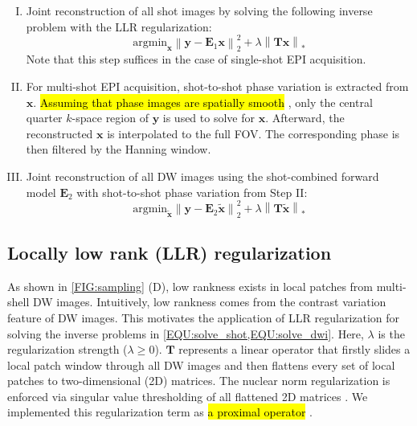 \documentclass[preprint,12pt,authoryear,review]{elsarticle}
\begin{document}
    \begin{enumerate}[I.]
        \item Joint reconstruction of all shot images
        by solving the following inverse problem with
        the LLR regularization:
        \begin{equation}
            \mathrm{argmin}_\mathbf{x} \left\| \mathbf{y} - \mathbf{E}_1 \mathbf{x} \right\|_2^2
            + \lambda \left\| \mathbf{T} \mathbf{x} \right\|_*
            \label{EQU:solve_shot}
        \end{equation}
            Note that this step suffices in the case of single-shot EPI acquisition.

        \item For multi-shot EPI acquisition,
        shot-to-shot phase variation is extracted from $\mathbf{x}$.
        \hl{Assuming that phase images are spatially smooth}
        \citep{chen_2013_muse,dai_2023_julep},
        only the central quarter $k$-space region of $\mathbf{y}$
        is used to solve for $\mathbf{x}$.
        Afterward, the reconstructed $\mathbf{x}$ is interpolated to the full FOV.
        The corresponding phase is then filtered by the Hanning window.

        \item Joint reconstruction of all DW images using
        the shot-combined forward model $\mathbf{E}_2$
        with shot-to-shot phase variation from Step II:
        \begin{equation}
            \mathrm{argmin}_\mathbf{\tilde{x}} \left\| \mathbf{y} - \mathbf{E}_2 \mathbf{\tilde{x}} \right\|_2^2
            + \lambda \left\| \mathbf{T} \mathbf{\tilde{x}} \right\|_*
            \label{EQU:solve_dwi}
        \end{equation}
    \end{enumerate}

    \subsection{Locally low rank (LLR) regularization}

    As shown in \cref{FIG:sampling} (D), low rankness exists
    in local patches from multi-shell DW images.
    Intuitively, low rankness comes from the contrast variation feature of DW images.
    This motivates the application of LLR regularization \citep{trzasko_2011_lr,zhang_2015_llr}
    for solving the inverse problems in \cref{EQU:solve_shot,EQU:solve_dwi}.
    Here, $\lambda$ is the regularization strength ($\lambda \geq 0$).
    $\mathbf{T}$ represents a linear operator that firstly slides a local patch window
    through all DW images and then
    flattens every set of local patches to two-dimensional (2D) matrices.
    The nuclear norm regularization is enforced via
        singular value thresholding of all flattened 2D matrices \citep{cai_2010_svt}.
    We implemented this regularization term as \hl{a proximal operator}
    \citep{beck_2017_optim}. 
\end{document}
